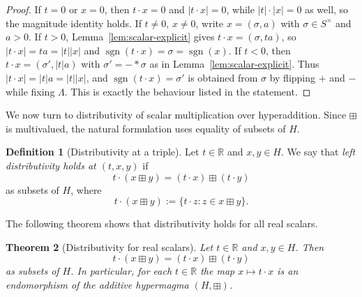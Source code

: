 \documentclass[11pt]{amsart}
\numberwithin{equation}{section}
\newtheorem{theorem}{Theorem}[section]
\theoremstyle{definition}
\newtheorem{definition}[theorem]{Definition}
\theoremstyle{remark}
\newcommand{\R}{\mathbb{R}}
\newcommand{\Hnum}{H}                      %
\newcommand{\Snon}{S^{\times}}             %
\newcommand{\sgn}{\operatorname{sgn}}
\newcommand{\op}{\boxplus}                 %
\begin{document}
\begin{proof}
If $t=0$ or $x=0$, then $t\cdot x=0$ and $|t\cdot x|=0$, while
$|t|\cdot|x|=0$ as well, so the magnitude identity holds.  If
$t\ne0$, $x\ne0$, write $x=(\sigma,a)$ with $\sigma\in\Snon$ and
$a>0$.  If $t>0$, Lemma~\ref{lem:scalar-explicit} gives
$t\cdot x = (\sigma,ta)$, so $|t\cdot x|=ta=|t||x|$ and
$\sgn(t\cdot x)=\sigma=\sgn(x)$.  If $t<0$, then
$t\cdot x = (\sigma',|t|a)$ with $\sigma'=-*\sigma$ as in
Lemma~\ref{lem:scalar-explicit}.  Thus $|t\cdot x|=|t|a=|t||x|$, and
$\sgn(t\cdot x)=\sigma'$ is obtained from $\sigma$ by flipping $+$ and
$-$ while fixing $\Lambda$.  This is exactly the behaviour listed in
the statement.
\end{proof}

We now turn to distributivity of scalar multiplication over
hyperaddition.  Since $\op$ is multivalued, the natural formulation
uses equality of subsets of $\Hnum$.

\begin{definition}[Distributivity at a triple]\label{def:scalar-distrib}
Let $t\in\R$ and $x,y\in\Hnum$.  We say that \emph{left distributivity
holds at $(t,x,y)$} if
\[
  t\cdot(x\op y)
  = (t\cdot x)\op(t\cdot y)
\]
as subsets of $\Hnum$, where
\[
  t\cdot(x\op y)
  := \{t\cdot z : z\in x\op y\}.
\]
\end{definition}

The following theorem shows that distributivity holds for all real scalars.

\begin{theorem}[Distributivity for real scalars]
\label{thm:scalar-Rge0}
Let $t\in\R$ and $x,y\in\Hnum$.  Then
\[
  t\cdot(x\op y) = (t\cdot x)\op(t\cdot y)
\]
as subsets of $\Hnum$.  In particular, for each $t\in\R$ the map
$x\mapsto t\cdot x$ is an endomorphism of the additive hypermagma
$(\Hnum,\op)$.
\end{theorem}
\end{document}
